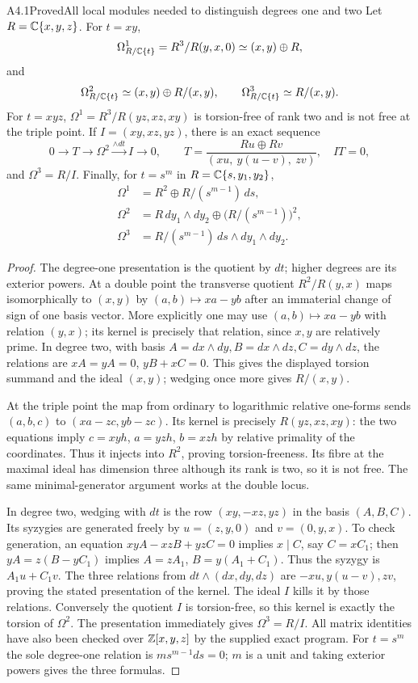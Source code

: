 \begin{claim}{A4.1}{Proved}{All local modules needed to distinguish degrees one and two}
Let $R=\mathbb C\{x,y,z\}$.  For $t=xy$,
\[
\Omega_{R/\mathbb C\{t\}}^1=R^3/R(y,x,0)
\simeq(x,y)\oplus R,
\]
and
\[
\Omega_{R/\mathbb C\{t\}}^2\simeq
(x,y)\oplus R/(x,y),\qquad
\Omega_{R/\mathbb C\{t\}}^3\simeq R/(x,y).
\]
For $t=xyz$,
$\Omega^1=R^3/R(yz,xz,xy)$ is torsion-free of rank two and is
not free at the triple point.  If $I=(xy,xz,yz)$, there is an exact
sequence
\[
0\to T\to\Omega^2\xrightarrow{\wedge dt} I\to0,
\qquad
T=\frac{R u\oplus R v}{(xu,\ y(u-v),\ zv)},
\quad IT=0,
\]
and $\Omega^3=R/I$.  Finally, for $t=s^m$ in
$R=\mathbb C\{s,y_1,y_2\}$,
\[
\begin{aligned}
\Omega^1&=R^2\oplus R/(s^{m-1})\,ds,\\
\Omega^2&=R\,dy_1\wedge dy_2
 \oplus\bigl(R/(s^{m-1})\bigr)^2,\\
\Omega^3&=R/(s^{m-1})\,ds\wedge dy_1\wedge dy_2.
\end{aligned}
\]
\end{claim}
\begin{proof}
The degree-one presentation is the quotient by $dt$; higher degrees
are its exterior powers.  At a double point the transverse quotient
$R^2/R(y,x)$ maps isomorphically to $(x,y)$ by
$(a,b)\mapsto xa-yb$ after an immaterial change of sign of one
basis vector.  More explicitly one may use
$(a,b)\mapsto xa-yb$ with relation $(y,x)$; its kernel is precisely
that relation, since $x,y$ are relatively prime.  In degree two,
with basis $A=dx\wedge dy,B=dx\wedge dz,C=dy\wedge dz$, the
relations are $xA=yA=0$, $yB+xC=0$.  This gives the displayed
torsion summand and the ideal $(x,y)$; wedging once more gives
$R/(x,y)$.

At the triple point the map from ordinary to logarithmic relative
one-forms sends $(a,b,c)$ to $(xa-zc,yb-zc)$.
Its kernel is precisely $R(yz,xz,xy)$: the two equations imply
$c=xyh$, $a=yzh$, $b=xzh$ by relative primality of the coordinates.
Thus it injects into $R^2$, proving torsion-freeness.  Its fibre at
the maximal ideal has dimension three although its rank is two,
so it is not free.  The same minimal-generator argument works at
the double locus.

In degree two, wedging with $dt$ is the row
$(xy,-xz,yz)$ in the basis $(A,B,C)$.
Its syzygies are generated freely by
$u=(z,y,0)$ and $v=(0,y,x)$.
To check generation, an equation $xyA-xzB+yzC=0$ implies
$x\mid C$, say $C=xC_1$; then $yA=z(B-yC_1)$ implies
$A=zA_1$, $B=y(A_1+C_1)$.  Thus the syzygy is $A_1u+C_1v$.
The three relations from $dt\wedge(dx,dy,dz)$ are
$-xu,y(u-v),zv$, proving the stated presentation of the kernel.
The ideal $I$ kills it by those relations.  Conversely the quotient
$I$ is torsion-free, so this kernel is exactly the torsion of
$\Omega^2$.  The presentation immediately gives $\Omega^3=R/I$.
All matrix identities have also been checked over $\mathbb Z[x,y,z]$ by
the supplied exact program.  For $t=s^m$ the sole degree-one
relation is $ms^{m-1}ds=0$; $m$ is a unit and taking exterior
powers gives the three formulas.
\end{proof}

